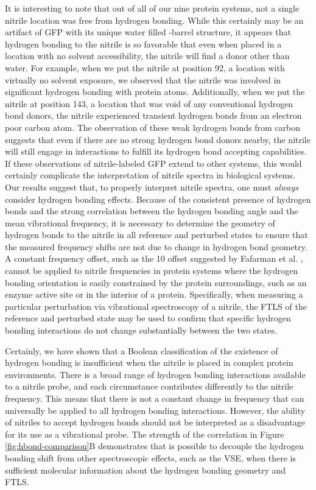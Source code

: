 It is interesting to note that out of all of our nine protein systems, not a single nitrile location was free from hydrogen bonding.
While this certainly may be an artifact of GFP with its unique water filled \textbeta{}-barrel structure, it appears that hydrogen bonding to the nitrile is so favorable that even when placed in a location with no solvent accessibility, the nitrile will find a donor other than water.
For example, when we put the nitrile at position 92, a location with virtually no solvent exposure, we observed that the nitrile was involved in significant hydrogen bonding with protein atoms.
Additionally, when we put the nitrile at position 143, a location that was void of any conventional hydrogen bond donors, the nitrile experienced transient hydrogen bonds from an electron poor carbon atom.
The observation of these weak hydrogen bonds from carbon suggests that even if there are no strong hydrogen bond donors nearby, the nitrile will still engage in interactions to fulfill its hydrogen bond accepting capabilities.
If these observations of nitrile-labeled GFP extend to other systems, this would certainly complicate the interpretation of nitrile spectra in biological systems.
Our results suggest that, to properly interpret nitrile spectra, one must \emph{always} consider hydrogen bonding effects.
Because of the consistent presence of hydrogen bonds and the strong correlation between the hydrogen bonding angle and the mean vibrational frequency, it is necessary to determine the geometry of hydrogen bonds to the nitrile in all reference and perturbed states to ensure that the measured frequency shifts are not due to change in hydrogen bond geometry.
A constant frequency offset, such as the 10 \si{\wn} offset suggested by Fafarman et al. \cite{Fafarman2010}, cannot be applied to nitrile frequencies in protein systems where the hydrogen bonding orientation is easily constrained by the protein surroundings, such as an enzyme active site or in the interior of a protein.
Specifically, when measuring a particular perturbation via vibrational spectroscopy of a nitrile, the FTLS of the reference and perturbed state may be used to confirm that specific hydrogen bonding interactions do not change substantially between the two states.

Certainly, we have shown that a Boolean classification of the existence of hydrogen bonding is insufficient when the nitrile is placed in complex protein environments.
There is a broad range of hydrogen bonding interactions available to a nitrile probe, and each circumstance contributes differently to the nitrile frequency.
This means that there is not a constant change in frequency that can universally be applied to all hydrogen bonding interactions.
However, the ability of nitriles to accept hydrogen bonds should not be interpreted as a disadvantage for its use as a vibrational probe.
The strength of the correlation in Figure \ref{fig:hbond-comparison}B demonstrates that is possible to decouple the hydrogen bonding shift from other spectroscopic effects, such as the VSE, when there is sufficient molecular information about the hydrogen bonding geometry and FTLS.

